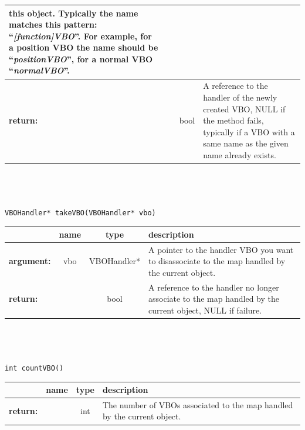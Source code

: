 \documentclass[a4paper]{scrreprt}
\begin{document}
\begin{center}
\begin{tabular}{|l|c|c|p{}|}
			this object. Typically the name matches this pattern:
			``\textit{[function]VBO}''. For example, for a position VBO the name should
			be ``\textit{positionVBO}'', for a normal VBO ``\textit{normalVBO}''.
		\\ \hline
		\textbf{return:} &  ~ & bool &
			A reference to the handler of the newly created VBO, NULL if the method
			fails, typically if a VBO with a same name as the given name already exists.
		\\ \hline
	\end{tabular}
	\\~\\~\\
		\texttt{VBOHandler* takeVBO(VBOHandler* vbo)}
	\begin{tabular}{|l|c|c|p{}|}
		\hline
		~ & name & type & description
		\\ \hline
		\textbf{argument:} & vbo & VBOHandler* &
			A pointer to the handler VBO you want to disassociate to the map handled by
			the current object.
		\\ \hline
		\textbf{return:} &  ~ & bool &
			A reference to the handler no longer associate to the map handled by
			the current object, NULL if failure.
		\\ \hline
	\end{tabular}
	\\~\\~\\
		\texttt{int countVBO()}
	\begin{tabular}{|l|c|c|p{}|}
		\hline
		~ & name & type & description
		\\ \hline
		\textbf{return:} & ~ & int &
			The number of VBOs associated to the map handled by
			the current object.
		\\ \hline
	\end{tabular}	
	\end{center}
	
\end{document}
